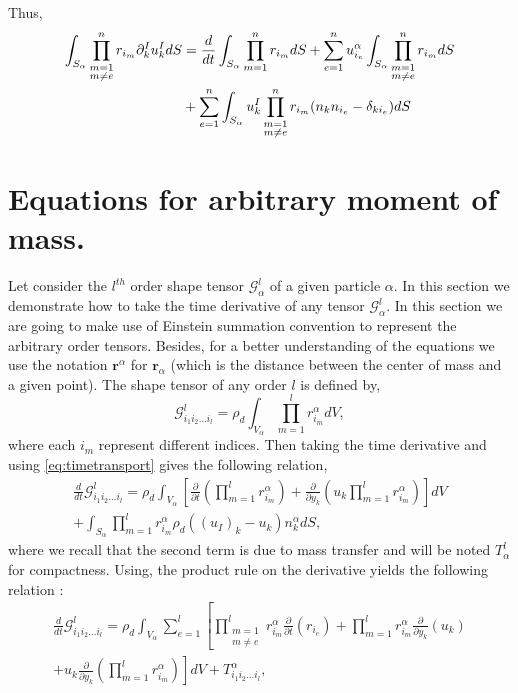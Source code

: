 Thus, 
\begin{align*}
    \int_{S_\alpha} 
    \prod_{\substack{m = 1 \\m \neq e}}^{n} r_{i_m}
    \partial_k^I u^I_k dS 
    &=
    \frac{d}{d t} \int_{S_\alpha} \prod_{m=1}^{n} r_{i_m}dS
    + \sum_{e=1}^n u^\alpha_{i_e} \int_{S_\alpha} 
    \prod_{\substack{m = 1 \\m \neq e}}^{n} r_{i_m}dS \\
    &+ \sum_{e=1}^n \int_{S_\alpha} u^I_k
    \prod_{\substack{m = 1 \\m \neq e}}^{n} r_{i_m}
    (n_kn_{i_e} - \delta_{ki_e}) dS \\
\end{align*}


\section{Equations for arbitrary moment of mass.}
Let consider the $l^{th}$ order shape tensor $\mathcal{G}^l_\alpha$ of a given particle $\alpha$. 
In this section we demonstrate how to take the time derivative of any tensor $\mathcal{G}^l_\alpha$. 
In this section we are going to make use of Einstein summation convention to represent the arbitrary order tensors. 
Besides, for a better understanding of the equations we use the notation $\bm{r}^\alpha$ for $\bm{r}_\alpha$ (which is the distance between the center of mass and a given point). 
The shape tensor of any order $l$ is defined by,
\begin{equation}
    \mathcal{G}_{i_1i_2\ldots i_l}^l = \rho_d \int_{V_\alpha} \prod^l_{m=1}r^\alpha_{i_m} dV,
\end{equation}
where each $i_m$ represent different indices. 
Then taking the time derivative and using \ref{eq:timetransport} gives the following relation,
\begin{multline}
    \frac{d}{dt}\mathcal{G}_{i_1i_2\ldots i_l}^l 
    = \rho_d \int_{V_\alpha} \left[ \frac{\partial}{\partial t} \left(\prod^l_{m=1}r^\alpha_{i_m}\right) 
    + \frac{\partial}{\partial y_k} \left(u_k\prod^l_{m=1}r^\alpha_{i_m}\right) \right]dV\\
    +\int_{S_\alpha} \prod^l_{m=1}r^\alpha_{i_m} \rho_d \left((u_I)_k - u_k\right) n_k^\alpha dS,
\end{multline}
where we recall that the second term is due to mass transfer and will be noted $T^l_\alpha$ for compactness. 
Using, the product rule on the derivative yields the following relation :
\begin{multline}
    \frac{d}{dt}\mathcal{G}_{i_1i_2\ldots i_l}^l 
    = \rho_d \int_{V_\alpha} \sum_{e=1}^l \left[ \prod^l_{\substack{ m=1 \\   m \neq e}}r^\alpha_{i_m} \frac{\partial}{\partial t} \left(r_{i_e}\right) 
    + \prod^l_{m=1}r^\alpha_{i_m} \frac{\partial}{\partial y_k} \left(u_k\right) 
    \right.\\
    \left.
    + u_k \frac{\partial}{\partial y_k} \left(\prod^l_{m=1}r^\alpha_{i_m}\right) \right]dV
    +T^\alpha_{i_1i_2\ldots i_l},
\end{multline}
